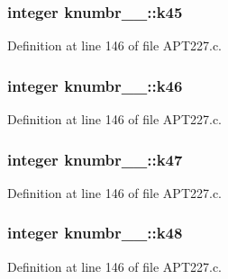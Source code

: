 \subsubsection[{\texorpdfstring{k45}{k45}}]{\setlength{\rightskip}{0pt plus 5cm}integer knumbr\+\_\+\_\+\+::k45}\hypertarget{structknumbr__1___aa3282d57571a59de2776ab3e10cbc5c0}{}\label{structknumbr__1___aa3282d57571a59de2776ab3e10cbc5c0}


Definition at line 146 of file A\+P\+T227.\+c.

\subsubsection[{\texorpdfstring{k46}{k46}}]{\setlength{\rightskip}{0pt plus 5cm}integer knumbr\+\_\+\_\+\+::k46}\hypertarget{structknumbr__1___ae0d67033ad23db0202e0978135a2a287}{}\label{structknumbr__1___ae0d67033ad23db0202e0978135a2a287}


Definition at line 146 of file A\+P\+T227.\+c.

\subsubsection[{\texorpdfstring{k47}{k47}}]{\setlength{\rightskip}{0pt plus 5cm}integer knumbr\+\_\+\_\+\+::k47}\hypertarget{structknumbr__1___a966240e5a6b35f52e6048eb52d002fb1}{}\label{structknumbr__1___a966240e5a6b35f52e6048eb52d002fb1}


Definition at line 146 of file A\+P\+T227.\+c.

\subsubsection[{\texorpdfstring{k48}{k48}}]{\setlength{\rightskip}{0pt plus 5cm}integer knumbr\+\_\+\_\+\+::k48}\hypertarget{structknumbr__1___ae31eb99515012d31c2c1937023a4eea6}{}\label{structknumbr__1___ae31eb99515012d31c2c1937023a4eea6}


Definition at line 146 of file A\+P\+T227.\+c.


